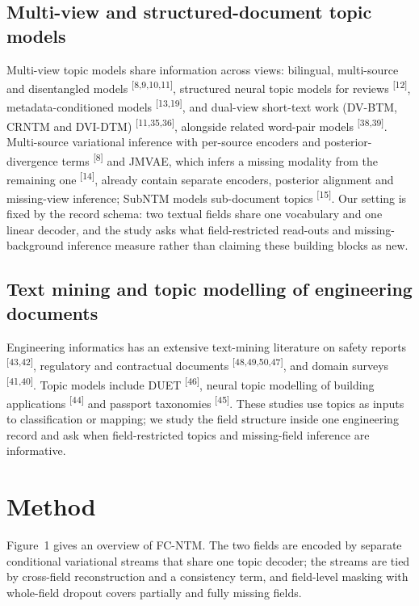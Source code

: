 \documentclass{article}
\begin{document}
\subsection{Multi-view and structured-document topic models}

Multi-view topic models share information across views: bilingual, multi-source and disentangled
models \textsuperscript{[8,9,10,11]},
structured neural topic models for reviews \textsuperscript{[12]}, metadata-conditioned
models \textsuperscript{[13,19]}, and dual-view short-text work (DV-BTM, CRNTM and
DVI-DTM) \textsuperscript{[11,35,36]}, alongside related word-pair models
\textsuperscript{[38,39]}. Multi-source variational inference with per-source encoders
and posterior-divergence terms \textsuperscript{[8]} and JMVAE, which infers a missing
modality from the remaining one \textsuperscript{[14]}, already contain separate encoders,
posterior alignment and missing-view inference; SubNTM models sub-document topics
\textsuperscript{[15]}. Our setting is fixed by the record schema: two textual fields share one
vocabulary and one linear decoder, and the study asks what field-restricted read-outs and
missing-background inference measure rather than claiming these building blocks as new.

\subsection{Text mining and topic modelling of engineering documents}

Engineering informatics has an extensive text-mining literature on safety reports
\textsuperscript{[43,42]}, regulatory and contractual documents
\textsuperscript{[48,49,50,47]}, and domain surveys
\textsuperscript{[41,40]}. Topic models include DUET \textsuperscript{[46]}, neural topic modelling
of building applications \textsuperscript{[44]} and passport taxonomies \textsuperscript{[45]}. These
studies use topics as inputs to classification or mapping; we study the field structure inside one
engineering record and ask when field-restricted topics and missing-field inference are
informative.

\section{Method}

Figure~1 gives an overview of FC-NTM. The two fields are encoded by separate
conditional variational streams that share one topic decoder; the streams are tied by cross-field
reconstruction and a consistency term, and field-level masking with whole-field dropout covers
partially and fully missing fields.
\end{document}
